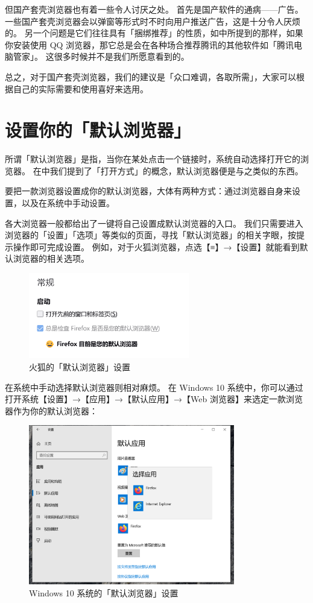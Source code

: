 但国产套壳浏览器也有着一些令人讨厌之处。
首先是国产软件的通病——广告。
一些国产套壳浏览器会以弹窗等形式时不时向用户推送广告，这是十分令人厌烦的。
另一个问题是它们往往具有「捆绑推荐」的性质，如中所提到的那样，如果你安装使用 QQ 浏览器，那它总是会在各种场合推荐腾讯的其他软件如「腾讯电脑管家」。
这很多时候并不是我们所愿意看到的。

总之，对于国产套壳浏览器，我们的建议是「众口难调，各取所需」，大家可以根据自己的实际需要和使用喜好来选用。

\section{设置你的「默认浏览器」}

所谓「默认浏览器」是指，当你在某处点击一个链接时，系统自动选择打开它的浏览器。
在中我们提到了「打开方式」的概念，默认浏览器便是与之类似的东西。

要把一款浏览器设置成你的默认浏览器，大体有两种方式：通过浏览器自身来设置，以及在系统中手动设置。

各大浏览器一般都给出了一键将自己设置成默认浏览器的入口。
我们只需要进入浏览器的「设置」「选项」等类似的页面，寻找「默认浏览器」的相关字眼，按提示操作即可完成设置。
例如，对于火狐浏览器，点选【≡】→【设置】就能看到默认浏览器的相关选项。

\begin{figure}[htb!]
  \centering
  \includegraphics[width=7cm]{assets/Firefox_Default.png}
  \caption{火狐的「默认浏览器」设置}
  \label{Firefox_Default}
\end{figure}

在系统中手动选择默认浏览器则相对麻烦。
在 Windows 10 系统中，你可以通过打开系统【设置】→【应用】→【默认应用】→【Web 浏览器】来选定一款浏览器作为你的默认浏览器：

\begin{figure}[htb!]
  \centering
  \includegraphics[width=9cm]{assets/Win_10_Default_Browser.png}
  \caption{Windows 10 系统的「默认浏览器」设置}
  \label{Win_10_Default_Browser}
\end{figure}

